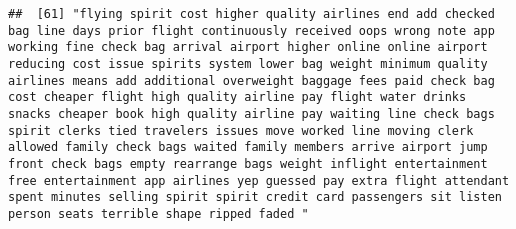 \documentclass[
]{article}
\begin{document}
\begin{verbatim}
##  [61] "flying spirit cost higher quality airlines end add checked bag line days prior flight continuously received oops wrong note app working fine check bag arrival airport higher online online airport reducing cost issue spirits system lower bag weight minimum quality airlines means add additional overweight baggage fees paid check bag cost cheaper flight high quality airline pay flight water drinks snacks cheaper book high quality airline pay waiting line check bags spirit clerks tied travelers issues move worked line moving clerk allowed family check bags waited family members arrive airport jump front check bags empty rearrange bags weight inflight entertainment free entertainment app airlines yep guessed pay extra flight attendant spent minutes selling spirit spirit credit card passengers sit listen person seats terrible shape ripped faded "                                                                                                                                                                                                                                                                                                                                                                                                                                                                                                                                                                                                                                                                                                                                                                                                                                                                                                           

\end{verbatim}
\end{document}
